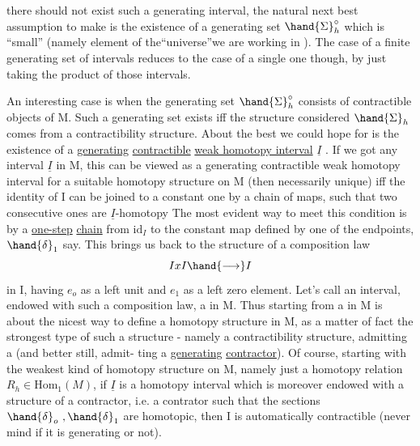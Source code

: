 there should not exist such a generating interval,  the natural next best
assumption to make is the existence of a generating set $\hand{\Sigma}_h^{\circ}$ which is
``small''  (namely  element of the``universe''we are working  in ).  The
case of a finite generating set of intervals reduces to the case of a
single one though,  by just
taking the product of those intervals.

An interesting case is when the generating set $\hand{\Sigma}_h^{\circ}$ consists of
contractible objects of M.  Such a generating set exists iff the structure
considered $\hand{\Sigma}_h$ comes from a contractibility structure.  About the best we
could hope for is the existence of a  \uline{generating} \uline{contractible} 
\uline{weak homotopy interval} $\underline{I}$ .  If we got any interval $\underline{I}$ in M,  this can be
viewed as a generating contractible weak homotopy  interval
for a suitable homotopy structure on M (then necessarily unique) iff
 the identity   of I can be joined to a constant
one by a chain of maps, such that two consecutive ones are  $\underline{I}$-homotopy 
The most evident way to meet this condition is by a \uline{one-step} \uline{chain} from
$\mathrm{id}_I$ to the constant map defined by one of the endpoints, $\hand{\delta}_1$ say.  This
brings us back to the structure of a composition law
\[ IxI \hand{\longrightarrow} I \]
in I,  having $e_o$ as a left unit and $e_1$ as a left zero element.  Let's
 call an interval,  endowed with such a composition law,  a \uline{}
in M.  Thus starting from a  in M is about the nicest way to
define a homotopy structure in M,  as a matter of fact the strongest type
of such a structure  - namely a contractibility structure,  admitting a
    (and better still, admit-%
ting a \uline{generating} \uline{contractor}). \margin{//} Of course,  starting with the weakest
kind of homotopy structure on M,  namely just a homotopy relation
$R_h \in \mathrm{Hom}_1(M)$,  if $\underline{I}$ is a homotopy interval which is moreover endowed with
 a structure of a contractor,   i.e.  a contrator such that the
 sections $\hand{\delta}_o\ ,\hand{\delta}_1$  are homotopic,  then I is automatically contractible
(never mind if it is generating or not).  

